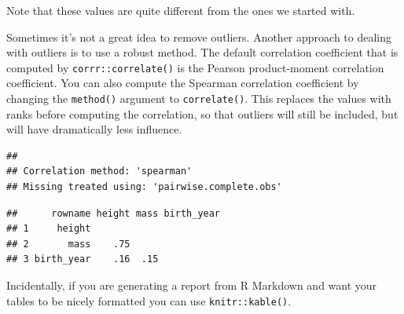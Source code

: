 \documentclass[]{book}
\newenvironment{Shaded}{\begin{snugshade}}{\end{snugshade}}
\newcommand{\DataTypeTok}[1]{\textcolor[rgb]{0.13,0.29,0.53}{#1}}
\newcommand{\KeywordTok}[1]{\textcolor[rgb]{0.13,0.29,0.53}{\textbf{#1}}}
\newcommand{\NormalTok}[1]{#1}
\newcommand{\OperatorTok}[1]{\textcolor[rgb]{0.81,0.36,0.00}{\textbf{#1}}}
\newcommand{\StringTok}[1]{\textcolor[rgb]{0.31,0.60,0.02}{#1}}
\begin{document}
Note that these values are quite different from the ones we started with.

Sometimes it's not a great idea to remove outliers. Another approach to dealing with outliers is to use a robust method. The default correlation coefficient that is computed by \texttt{corrr::correlate()} is the Pearson product-moment correlation coefficient. You can also compute the Spearman correlation coefficient by changing the \texttt{method()} argument to \texttt{correlate()}. This replaces the values with ranks before computing the correlation, so that outliers will still be included, but will have dramatically less influence.

\begin{Shaded}
\end{Shaded}

\begin{verbatim}
## 
## Correlation method: 'spearman'
## Missing treated using: 'pairwise.complete.obs'
\end{verbatim}

\begin{verbatim}
##      rowname height mass birth_year
## 1     height                       
## 2       mass    .75                
## 3 birth_year    .16  .15
\end{verbatim}

Incidentally, if you are generating a report from R Markdown and want your tables to be nicely formatted you can use \texttt{knitr::kable()}.

\begin{Shaded}
\end{Shaded}
\end{document}
